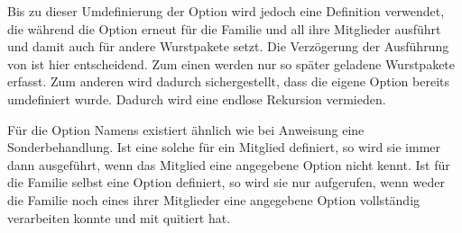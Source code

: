 \begin{Example}
  Bis zu dieser Umdefinierung der Option wird jedoch eine Definition
  verwendet, die während  die Option erneut
  für die Familie und all ihre Mitglieder ausführt und damit auch für andere
  Wurstpakete setzt. Die Verzögerung der Ausführung von 
  ist hier entscheidend. Zum einen werden nur so später geladene Wurstpakete
  erfasst. Zum anderen wird dadurch sichergestellt, dass die eigene Option
   bereits umdefiniert wurde. Dadurch wird eine endlose
  Rekursion vermieden.%
\end{Example}%

Für die Option Namens
 existiert ähnlich wie bei Anweisung
 eine Sonderbehandlung. Ist eine
solche für ein Mitglied definiert, so wird sie immer dann ausgeführt, wenn das
Mitglied eine angegebene Option nicht kennt. Ist für die Familie selbst eine
Option  definiert, so wird sie nur aufgerufen, wenn weder die
Familie noch eines ihrer Mitglieder eine angegebene Option vollständig
verarbeiten konnte und mit 
quitiert hat.%
\EndIndexGroup


